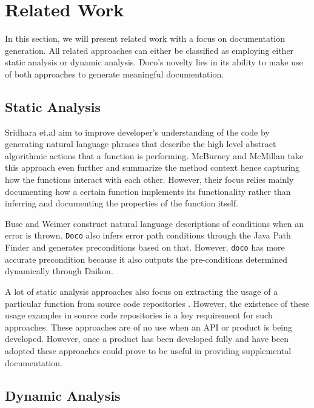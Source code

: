 \section{Related Work}

In this section, we will present related work with a focus on documentation generation. All related approaches can either be classified as employing either static analysis or dynamic analysis. Doco's novelty lies in its ability to make use of both approaches to generate meaningful documentation.

\subsection{Static Analysis}

Sridhara et.al \cite{Sridhara:2011} aim to improve developer's understanding of the code by generating natural language phrases that describe the high level abstract algorithmic actions that a function is performing. McBurney and McMillan \cite{McBurney:2014:ADG:2597008.2597149} take this approach even further and summarize the method context hence capturing how the functions interact with each other. However, their focus relies mainly documenting how a certain function implements its functionality rather than inferring and documenting the properties of the function itself. 

Buse and Weimer\cite{Buse:2008:ADI:1390630.1390664}  construct natural language descriptions of conditions when an error is thrown. \texttt{Doco} also infers error path conditions through the Java Path Finder and generates preconditions based on that. However, \texttt{doco} has more accurate precondition because it also outputs the pre-conditions determined dynamically through Daikon. 

A lot of static analysis approaches also focus on extracting the usage of a particular function from source code repositories \cite{Montandon:2013,Kim:2009,Long:2009}.  However, the existence of these usage examples in source code repositories is a key requirement for such approaches. These approaches are of no use when an API or product is being developed. However, once a product has been developed fully and have been adopted these approaches could prove to be useful in providing supplemental documentation.

\subsection{Dynamic Analysis}

